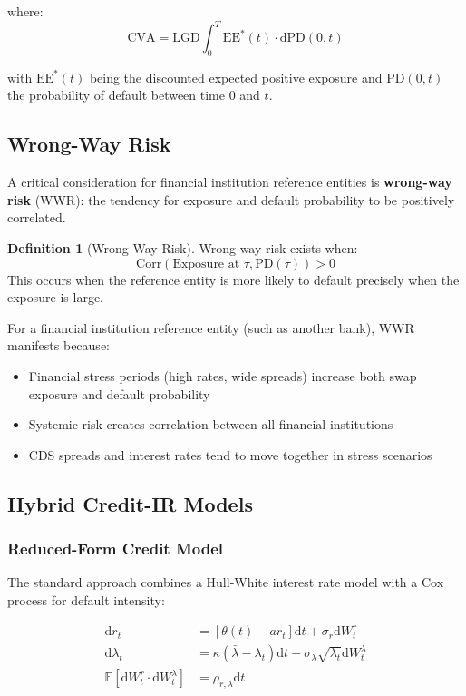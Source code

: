 \documentclass[conference]{IEEEtran}
\theoremstyle{definition}
\newtheorem{definition}{Definition}[section]
\newcommand{\E}{\mathbb{E}}
\newcommand{\diff}{\mathrm{d}}
\newcommand{\LGD}{\mathrm{LGD}}
\newcommand{\PD}{\mathrm{PD}}
\newcommand{\EE}{\mathrm{EE}}
\newcommand{\CVA}{\mathrm{CVA}}
\begin{document}
where:
\begin{equation}
\CVA = \LGD \int_0^T \EE^*(t) \cdot \diff \PD(0,t)
\end{equation}

with $\EE^*(t)$ being the discounted expected positive exposure and $\PD(0,t)$ the probability of default between time 0 and $t$.

\subsection{Wrong-Way Risk}

A critical consideration for financial institution reference entities is \textbf{wrong-way risk} (WWR): the tendency for exposure and default probability to be positively correlated.

\begin{definition}[Wrong-Way Risk]
Wrong-way risk exists when:
\begin{equation}
\text{Corr}(\text{Exposure at } \tau, \PD(\tau)) > 0
\end{equation}
This occurs when the reference entity is more likely to default precisely when the exposure is large.
\end{definition}

For a financial institution reference entity (such as another bank), WWR manifests because:
\begin{itemize}
    \item Financial stress periods (high rates, wide spreads) increase both swap exposure and default probability
    \item Systemic risk creates correlation between all financial institutions
    \item CDS spreads and interest rates tend to move together in stress scenarios
\end{itemize}

\subsection{Hybrid Credit-IR Models}

\subsubsection{Reduced-Form Credit Model}

The standard approach combines a Hull-White interest rate model with a Cox process for default intensity:

\begin{align}
\diff r_t &= [\theta(t) - a r_t] \diff t + \sigma_r \diff W^r_t \\
\diff \lambda_t &= \kappa(\bar{\lambda} - \lambda_t) \diff t + \sigma_\lambda \sqrt{\lambda_t} \diff W^\lambda_t \\
\E[\diff W^r_t \cdot \diff W^\lambda_t] &= \rho_{r,\lambda} \diff t
\end{align}
\end{document}
